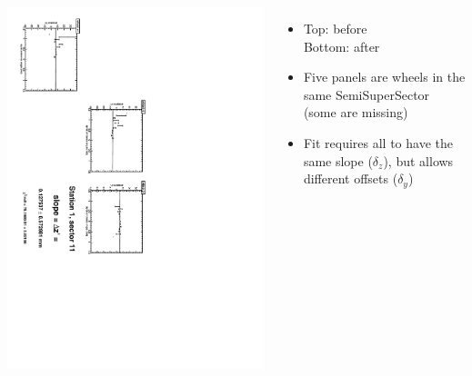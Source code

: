 \documentclass[compress]{beamer}
\begin{document}
\begin{frame}
\begin{columns}
\vfill
\includegraphics[height=\linewidth, angle=90]{zfits_after/zfit_1_11.pdf}
\begin{itemize}
\item Top: before \\ Bottom: after
\item Five panels are wheels in the same SemiSuperSector (some are missing)
\item Fit requires all to have the same slope ($\delta_z$), but allows different offsets ($\delta_y$)
\end{itemize}
\end{columns}
\end{frame}
\end{document}

